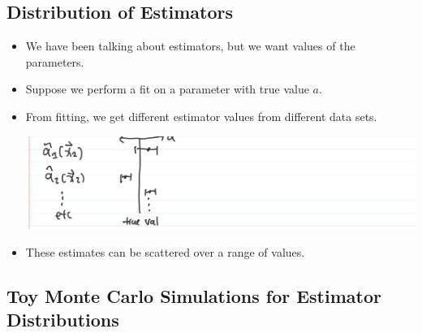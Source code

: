 \subsection{Distribution of Estimators}

\begin{itemize}
      \item We have been talking about estimators, but we want values of the parameters.
      \item Suppose we perform a fit on a parameter with true value $a$.
      \item From fitting, we get different estimator values from different data sets.

            \includegraphics[width=0.5\linewidth]{Images/lec11-spread-est-vals.png}

      \item These estimates can be scattered over a range of values.
\end{itemize}

\subsection{Toy Monte Carlo Simulations for Estimator Distributions}

